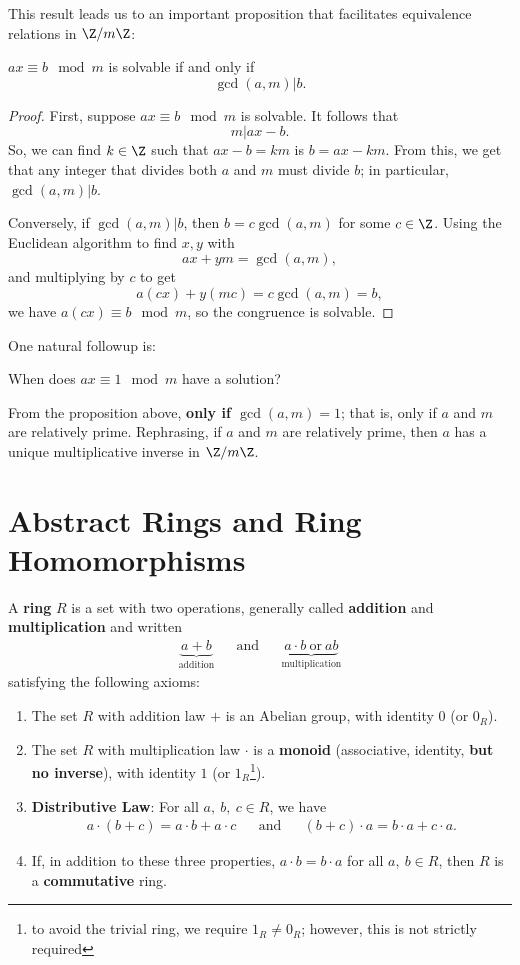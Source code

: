 \documentclass[math1530-lecture-notes]{subfiles}
\begin{document}
This result leads us to an important proposition that facilitates equivalence relations in $\Z /
m\Z$:
\begin{proposition}[]{}
  $ax \equiv b\mod{m}$ is solvable if and only if \[
    \gcd{(a,m)}|b
  .\] 
\end{proposition}
\begin{proof}[Proof]
  First, suppose $ax\equiv b\mod{m}$ is solvable. It follows that \[
    m | ax-b
  .\] So, we can find $k\in \Z$ such that $ax-b=km$ is $b=ax-km$. From this, we get that any integer
  that divides both $a$ and $m$ must divide $b$; in particular, $\gcd{(a,m)}|b$.

  Conversely, if $\gcd{(a,m)}|b$, then $b=c\gcd{(a,m)}$ for some $c\in \Z$. Using the Euclidean
  algorithm to find $x,y$ with \[
    ax+ym=\gcd{(a,m)}
  ,\] and multiplying by $c$ to get \[
    a(cx) + y(mc) = c\gcd{(a,m)}=b
  ,\] we have $a(cx)\equiv b\mod{m}$, so the congruence is solvable.
\end{proof}

One natural followup is: \begin{center}
  When does $ax\equiv 1\mod{m}$ have a solution?
\end{center}
From the proposition above, \textbf{only if $ \gcd{(a,m)}=1$}; that is, only if $a$ and $m$ are
relatively prime. Rephrasing, if $a$ and $m$ are relatively prime, then $a$ has a unique
multiplicative inverse in $\Z / m\Z$.

\section{Abstract Rings and Ring Homomorphisms}

\begin{definition}[Rings]{}
  A \textbf{ring} $R$ is a set with two operations, generally called \textbf{addition} and
  \textbf{multiplication} and written
  \begin{align*}
    \underbrace{a+b}_{\text{addition}} &&\text{and}&& \underbrace{a\cdot b
    ~\text{or}~ab}_{\text{multiplication}}
  \end{align*}
  satisfying the following axioms:
  \begin{enumerate}
    \item The set $R$ with addition law $+$ is an Abelian group, with identity $0$ (or $0_R$).
    \item The set $R$ with multiplication law $\cdot $ is a \textbf{monoid} (associative, identity,
      \textbf{but no inverse}), with identity $1$ (or $1_R$\footnote{to avoid the trivial ring, we
      require $1_R\neq 0_R$; however, this is not strictly required}).
    \item \textbf{Distributive Law}: For all $a,\ b,\ c\in R$, we have
      \begin{align*}
        a\cdot (b+c)=a\cdot b+a\cdot c && \text{and} && (b+c)\cdot a= b\cdot a+c\cdot a
      .\end{align*}
    \item If, in addition to these three properties, $a\cdot b=b\cdot a$ for all $a,\ b\in R$, then
      $R$ is a \textbf{commutative} ring.
  \end{enumerate}
\end{definition}
\end{document}

